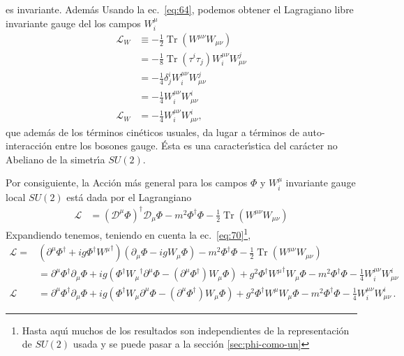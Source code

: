 es invariante. Adem\'as
Usando la ec.~\eqref{eq:64}, podemos obtener el Lagragiano libre invariante gauge del los campos $W^\mu_i$
\begin{align}
  \mathcal{L}_W&\equiv-\tfrac{1}{2}\operatorname{Tr}\left(W^{\mu\nu}W_{\mu\nu}\right)\nonumber\\
  &=-\tfrac{1}{8}\operatorname{Tr}\left({\tau^i}{\tau_j}\right)W^{\mu\nu}_i W_{\mu\nu}^j \nonumber\\
  &=-\tfrac{1}{4}\delta^i_j W^{\mu\nu}_i W_{\mu\nu}^j \nonumber\\
  &=-\tfrac{1}{4}W^{\mu\nu}_i W_{\mu\nu}^i \nonumber\\
  \label{eq:76}
 \mathcal{L}_W &=-\tfrac{1}{4}W^{\mu\nu}_i W_{\mu\nu}^i ,
\end{align}
que adem\'as de los t\'erminos cin\'eticos usuales, da lugar a t\'erminos de auto-interacci\'on entre los bosones gauge. \'Esta es una caracter\'\i stica del car\'acter no Abeliano de la simetr\'\i a $SU(2)$.


Por consiguiente, la Acci\'on m\'as general para los campos $\Phi$ y $W^\mu_i$ invariante gauge local $SU(2)$ est\'a dada por el Lagrangiano
\begin{align}
  \label{eq:78}
  \mathcal{L}&=\left(\mathcal{D}^\mu\Phi\right)^\dagger\mathcal{D}_\mu\Phi-m^2\Phi^\dagger \Phi-\tfrac{1}{2}\operatorname{Tr}\left(W^{\mu\nu}W_{\mu\nu}\right)
\end{align}
Expandiendo tenemos, teniendo en cuenta la ec.~\eqref{eq:70}\footnote{Hasta aqu\'\i{} muchos de los resultados son independientes de la representaci\'on de $SU(2)$ usada y se puede pasar a la secci\'on \ref{sec:phi-como-un}}, 
\begin{align}
  \mathcal{L}=&\left(\partial^\mu\Phi^\dagger+ig\Phi^\dagger{W^\mu}^\dagger\right)\left(\partial_\mu\Phi-igW_\mu\Phi\right)
  -m^2\Phi^\dagger \Phi
  -\tfrac{1}{2}\operatorname{Tr}\left(W^{\mu\nu}W_{\mu\nu}\right)\nonumber\\
&=\partial^\mu\Phi^\dagger\partial_\mu\Phi+ig\left(\Phi^\dagger{W_\mu}^\dagger\partial^\mu\Phi-\left(\partial^\mu\Phi^\dagger\right) W_\mu\Phi\right)+g^2\Phi^\dagger{W^\mu}^\dagger W_\mu\Phi
-m^2\Phi^\dagger \Phi
-\tfrac{1}{4}W^{\mu\nu}_i W_{\mu\nu}^i\nonumber\\
\label{eq:72}
\mathcal{L}&=\partial^\mu\Phi^\dagger\partial_\mu\Phi+ig\left(\Phi^\dagger W_\mu\partial^\mu\Phi-\left(\partial^\mu\Phi^\dagger\right)W_\mu\Phi\right)+g^2\Phi^\dagger W^\mu W_\mu\Phi
-m^2\Phi^\dagger \Phi
-\tfrac{1}{4}W^{\mu\nu}_i W_{\mu\nu}^i\,.
\end{align}

